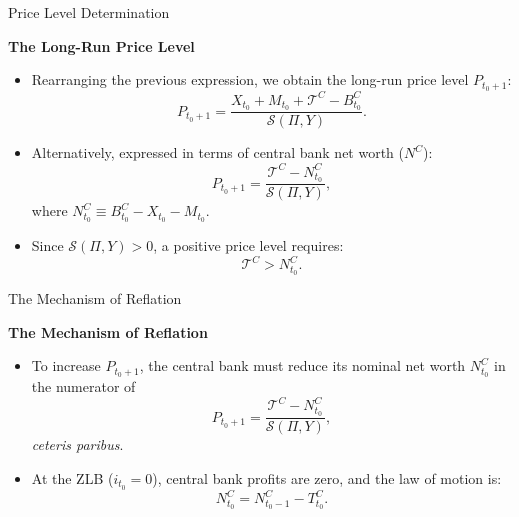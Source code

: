 \documentclass[11pt,aspectratio=169]{beamer}
\begin{document}
\begin{frame}{Price Level Determination}
\small

\textbf{The Long-Run Price Level}
 \vspace{0.2cm}
\begin{itemize}
    \item Rearranging the previous expression, we obtain the long-run price level $P_{t_{0}+1}$:
    \begin{equation*}
        P_{t_{0}+1} = \frac{X_{t_{0}}+M_{t_{0}}+\mathcal{T}^{C}-B_{t_{0}}^{C}}{\mathcal{S}(\Pi ,Y)}.
    \end{equation*}
    \item Alternatively, expressed in terms of central bank  net worth ($N^C$):
    \begin{equation}
        P_{t_{0}+1} = \frac{\mathcal{T}^{C}-N_{t_{0}}^{C}}{\mathcal{S}(\Pi ,Y)}, \label{PriceCB0}
    \end{equation}
    where $N_{t_{0}}^{C} \equiv B_{t_{0}}^{C}-X_{t_{0}}-M_{t_{0}}$.
\end{itemize}

\vspace{0.4cm}
\begin{itemize}
    \item Since $\mathcal{S}(\Pi, Y) > 0$, a positive price level requires:
    \begin{equation*}
        \mathcal{T}^{C} > N_{t_{0}}^{C}.
    \end{equation*}
\end{itemize}
\end{frame}
\begin{frame}{The Mechanism of Reflation}
\small

\textbf{The Mechanism of Reflation}
 \vspace{0.3cm}
\begin{itemize}
    \item To increase $P_{t_0+1}$, the central bank  must reduce its nominal net worth $N_{t_0}^C$ in the numerator of
    \begin{equation}
        P_{t_{0}+1} = \frac{\mathcal{T}^{C}-N_{t_{0}}^{C}}{\mathcal{S}(\Pi ,Y)} \label{PriceCB0bis},
    \end{equation} \emph{ceteris paribus}.
    \item At the ZLB ($i_{t_0}=0$), central bank  profits are zero, and the law of motion is:
    \begin{equation}
        N_{t_{0}}^{C} = N_{t_{0}-1}^{C} - T_{t_{0}}^{C}. \label{CBNW}
    \end{equation}
\end{itemize}
\end{frame}
\end{document}
